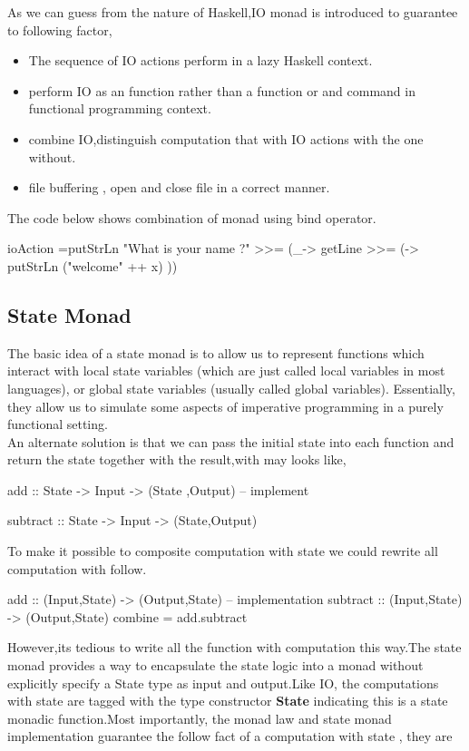As we can guess from the nature of Haskell,IO monad is introduced to guarantee to following factor,

\begin{itemize}
\item The sequence of IO actions perform in a lazy Haskell context.
\item perform IO as an function rather than a function or and command in functional programming context.
\item combine IO,distinguish computation that with IO actions with the one without.
\item  file buffering , open and close file in a correct manner.
\end{itemize}


The code below shows combination of monad using bind operator.
\begin{hcode}
ioAction 
  =putStrLn "What is your name ?"
	 >>= (_-> getLine >>= 
		(\x -> putStrLn ("welcome" ++ x) ))
\end{hcode}


\subsection{State Monad}
The basic idea of a state monad is to allow us to represent functions which interact with local state variables (which are just called local variables in most languages), or global state variables (usually called global variables). Essentially, they allow us to simulate some aspects of imperative programming in a purely functional setting.\\

An alternate solution is that we can pass the initial state into each function and return the state together with the result,with may looks like,
\begin{hcode}
add :: State -> Input -> (State ,Output)
-- implement

subtract :: State -> Input -> (State,Output)
\end{hcode}


To make it possible to composite computation with state we could rewrite all computation with follow.

\begin{hcode}
add :: (Input,State) -> (Output,State)
-- implementation 
subtract :: (Input,State) -> (Output,State)
combine = add.subtract 
\end{hcode}

However,its tedious to write all the function with computation this way.The state monad provides a way to encapsulate the state logic into a monad without explicitly specify a State type as input and output.Like IO, the computations with state  are tagged with the type constructor \textbf{State} indicating this is a state monadic function.Most importantly, the monad law and state monad implementation guarantee the follow fact of a computation with state , they are

